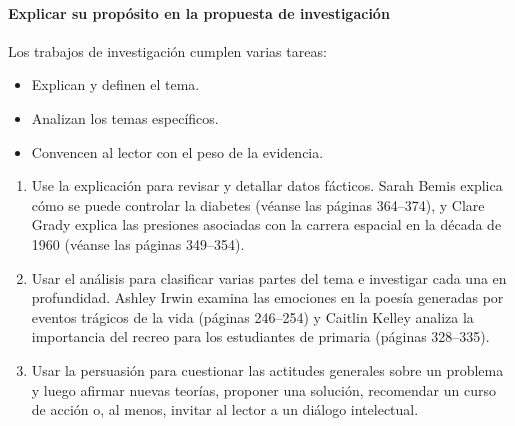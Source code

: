 \paragraph{Explicar su propósito en la propuesta de investigación}
Los trabajos de investigación cumplen varias tareas: 
\begin{itemize}
    \item Explican y definen el tema. 
    \item Analizan los temas específicos. 
    \item Convencen al lector con el peso de la evidencia.
\end{itemize}
\begin{enumerate}[1.]
    \item  Use la explicación para revisar y detallar datos fácticos. Sarah Bemis explica cómo se puede controlar la diabetes (véanse las páginas 364–374), y Clare Grady explica las presiones asociadas con la carrera espacial en la década de 1960 (véanse las páginas 349–354). 
    \item Usar el análisis para clasificar varias partes del tema e investigar cada una en profundidad. Ashley Irwin examina las emociones en la poesía generadas por eventos trágicos de la vida (páginas 246–254) y Caitlin Kelley analiza la importancia del recreo para los estudiantes de primaria (páginas 328–335). 
    \item Usar la persuasión para cuestionar las actitudes generales sobre un problema y luego afirmar nuevas teorías, proponer una solución, recomendar un curso de acción o, al menos, invitar al lector a un diálogo intelectual.
\end{enumerate}

